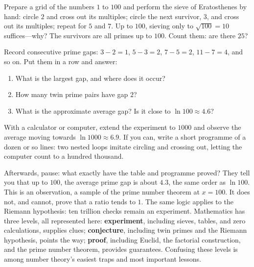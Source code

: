 \begin{shiyan}
Prepare a grid of the numbers $1$ to $100$ and perform the sieve of Eratosthenes by hand: circle $2$ and cross out its multiples; circle the next survivor, $3$, and cross out its multiples; repeat for $5$ and $7$. Up to $100$, sieving only to $\sqrt{100}=10$ suffices---why? The survivors are all primes up to $100$. Count them: are there $25$?

Record consecutive prime gaps: $3-2=1$, $5-3=2$, $7-5=2$, $11-7=4$, and so on. Put them in a row and answer:
\begin{enumerate}
  \item What is the largest gap, and where does it occur?
  \item How many twin prime pairs have gap $2$?
  \item What is the approximate average gap? Is it close to $\ln 100\approx 4.6$?
\end{enumerate}
With a calculator or computer, extend the experiment to $1000$ and observe the average moving towards $\ln 1000\approx 6.9$. If you can, write a short programme of a dozen or so lines: two nested loops imitate circling and crossing out, letting the computer count to a hundred thousand.
\end{shiyan}

Afterwards, pause: what exactly have the table and programme proved? They tell you that up to $100$, the average prime gap is about $4.3$, the same order as $\ln 100$. This is an observation, a sample of the prime number theorem at $x=100$. It does not, and cannot, prove that a ratio tends to $1$. The same logic applies to the Riemann hypothesis: ten trillion checks remain an experiment. Mathematics has three levels, all represented here: \textbf{experiment}, including sieves, tables, and zero calculations, supplies clues; \textbf{conjecture}, including twin primes and the Riemann hypothesis, points the way; \textbf{proof}, including Euclid, the factorial construction, and the prime number theorem, provides guarantees. Confusing these levels is among number theory's easiest traps and most important lessons.

